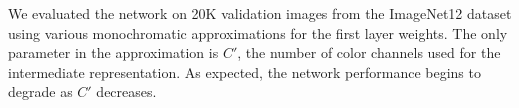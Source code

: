
We evaluated the network on 20K validation images from the ImageNet12 dataset using various monochromatic approximations for the first layer weights. 
The only parameter in the approximation is $C'$, the number of color channels used for the intermediate representation. As expected, the network performance begins to degrade as $C'$ decreases. 




